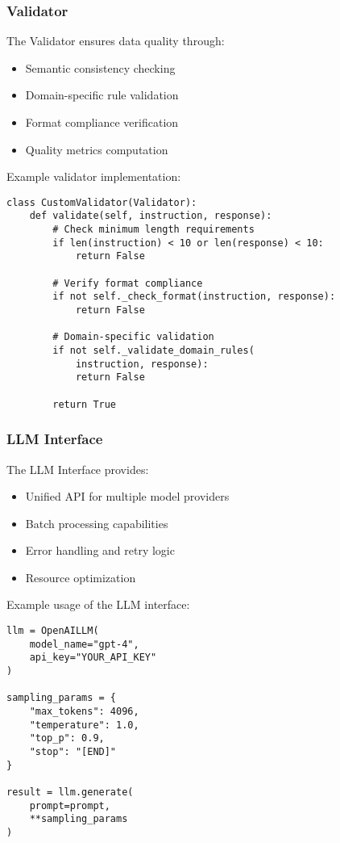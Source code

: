 \documentclass[10pt,conference]{IEEEtran}
\begin{document}
\subsubsection{Validator}
The Validator ensures data quality through:
\begin{itemize}
    \item Semantic consistency checking
    \item Domain-specific rule validation
    \item Format compliance verification
    \item Quality metrics computation
\end{itemize}

Example validator implementation:

\begin{lstlisting}
class CustomValidator(Validator):
    def validate(self, instruction, response):
        # Check minimum length requirements
        if len(instruction) < 10 or len(response) < 10:
            return False
            
        # Verify format compliance
        if not self._check_format(instruction, response):
            return False
            
        # Domain-specific validation
        if not self._validate_domain_rules(
            instruction, response):
            return False
            
        return True
\end{lstlisting}

\subsubsection{LLM Interface}
The LLM Interface provides:
\begin{itemize}
    \item Unified API for multiple model providers
    \item Batch processing capabilities
    \item Error handling and retry logic
    \item Resource optimization
\end{itemize}

Example usage of the LLM interface:

\begin{lstlisting}
llm = OpenAILLM(
    model_name="gpt-4",
    api_key="YOUR_API_KEY"
)

sampling_params = {
    "max_tokens": 4096,
    "temperature": 1.0,
    "top_p": 0.9,
    "stop": "[END]"
}

result = llm.generate(
    prompt=prompt,
    **sampling_params
)
\end{lstlisting}
\end{document}
